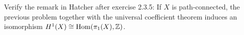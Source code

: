 \documentclass[12pt]{article}
\begin{document}
\begin{solution}

\end{solution}
\newpage

\begin{problem}{3}
Verify the remark in Hatcher after exercise 2.3.5: If $X$ is path-connected, the previous problem together with the universal coefficient theorem induces an isomorphism $H^1(X) \cong \mathrm{Hom}(\pi_1(X), \mathbb Z)$.
\end{problem}
\begin{solution}
\end{solution}
\newpage
\end{document}
